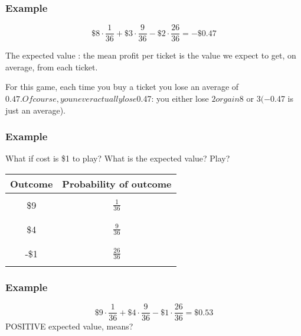 \begin{frame}
\frametitle{Example}

\begin{equation*}
\$8\cdot \frac{1}{36} + \$3\cdot \frac{9}{36} -\$2\cdot \frac{26}{36}=-\$0.47
\end{equation*}

The expected value : the mean profit per ticket is the value we expect to get, on average, from each ticket.

For this game, each time you buy a ticket you lose an average of $0.47. Of course, you never actually lose $0.47: you either lose $2 or gain $8 or $3 (-$0.47 is just an average).
\end{frame}



\begin{frame}
\frametitle{Example}
What if cost is \$1 to play?  What is the expected value?  Play?

\begin{center}
\begin{tabular}{|c|c|}
\hline
Outcome	&Probability of outcome\\
\hline
&\\
\$9  & $\frac{1}{36}$ \\
&\\
\hline
&\\
\$4& $\frac{9}{36}$ \\
&\\
\hline
&\\
-\$1& $\frac{26}{36}$\\
&\\
\hline
\end{tabular} 
\end{center}
\end{frame}

\begin{frame}
\frametitle{Example}
\begin{equation*}
\$9\cdot \frac{1}{36} + \$4\cdot \frac{9}{36} -\$1\cdot \frac{26}{36}= \$0.53
\end{equation*}
POSITIVE expected value, means?
\end{frame}

